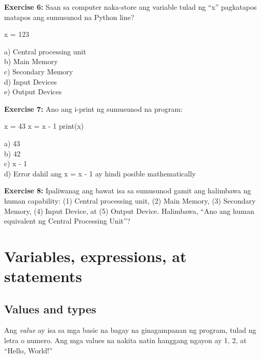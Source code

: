 \documentclass[10pt,]{book}
\newenvironment{Shaded}{}{}
\newcommand{\BuiltInTok}[1]{\textcolor[rgb]{0.00,0.50,0.00}{#1}}
\newcommand{\DecValTok}[1]{\textcolor[rgb]{0.25,0.63,0.44}{#1}}
\newcommand{\NormalTok}[1]{#1}
\newcommand{\OperatorTok}[1]{\textcolor[rgb]{0.40,0.40,0.40}{#1}}
\begin{document}
\textbf{Exercise 6:} Saan sa computer naka-store ang variable tulad ng
``x'' pagkatapos matapos ang sumusunod na Python line?

\begin{Shaded}
\begin{Highlighting}[]
\NormalTok{x }\OperatorTok{=} \DecValTok{123}
\end{Highlighting}
\end{Shaded}

a) Central processing unit\\
b) Main Memory\\
c) Secondary Memory\\
d) Input Devices\\
e) Output Devices

\textbf{Exercise 7:} Ano ang i-print ng sumusunod na program:

\begin{Shaded}
\begin{Highlighting}[]
\NormalTok{x }\OperatorTok{=} \DecValTok{43}
\NormalTok{x }\OperatorTok{=}\NormalTok{ x }\OperatorTok{{-}} \DecValTok{1}
\BuiltInTok{print}\NormalTok{(x)}
\end{Highlighting}
\end{Shaded}

a) 43\\
b) 42\\
c) x - 1\\
d) Error dahil ang x = x - 1 ay hindi posible mathematically

\textbf{Exercise 8:} Ipaliwanag ang bawat isa sa sumusunod gamit ang
halimbawa ng human capability: (1) Central processing unit, (2) Main
Memory, (3) Secondary Memory, (4) Input Device, at (5) Output Device.
Halimbawa, ``Ano ang human equivalent ng Central Processing Unit''?

\chapter{Variables, expressions, at
statements}\label{variables-expressions-at-statements}

\section{Values and types}\label{values-and-types}

  

Ang \emph{value} ay isa sa mga basic na bagay na ginagampanan ng
program, tulad ng letra o numero. Ang mga values na nakita natin
hanggang ngayon ay 1, 2, at ``Hello, World!''
\end{document}
